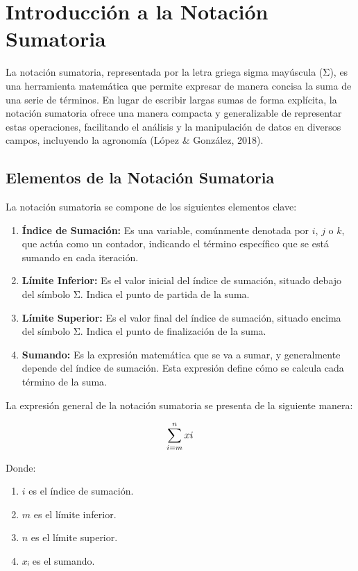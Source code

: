 \documentclass[
  spanish,
  letterpaper,
]{book}
\begin{document}
\chapter{Introducción a la Notación
Sumatoria}\label{introducciuxf3n-a-la-notaciuxf3n-sumatoria}

La notación sumatoria, representada por la letra griega sigma mayúscula
(Σ), es una herramienta matemática que permite expresar de manera
concisa la suma de una serie de términos. En lugar de escribir largas
sumas de forma explícita, la notación sumatoria ofrece una manera
compacta y generalizable de representar estas operaciones, facilitando
el análisis y la manipulación de datos en diversos campos, incluyendo la
agronomía (López \& González, 2018).

\section{Elementos de la Notación
Sumatoria}\label{elementos-de-la-notaciuxf3n-sumatoria}

La notación sumatoria se compone de los siguientes elementos clave:

\begin{enumerate}
\def\labelenumi{\arabic{enumi}.}
\item
  \textbf{Índice de Sumación:} Es una variable, comúnmente denotada por
  \(i\), \(j\) o \(k\), que actúa como un contador, indicando el término
  específico que se está sumando en cada iteración.
\item
  \textbf{Límite Inferior:} Es el valor inicial del índice de sumación,
  situado debajo del símbolo Σ. Indica el punto de partida de la suma.
\item
  \textbf{Límite Superior:} Es el valor final del índice de sumación,
  situado encima del símbolo Σ. Indica el punto de finalización de la
  suma.
\item
  \textbf{Sumando:} Es la expresión matemática que se va a sumar, y
  generalmente depende del índice de sumación. Esta expresión define
  cómo se calcula cada término de la suma.
\end{enumerate}

La expresión general de la notación sumatoria se presenta de la
siguiente manera:

\[\huge\sum_{i=m}^{n} xi\]

Donde:

\begin{enumerate}
\def\labelenumi{\arabic{enumi}.}
\item
  \(i\) es el índice de sumación.
\item
  \(m\) es el límite inferior.
\item
  \(n\) es el límite superior.
\item
  \(xᵢ\) es el sumando.
\end{enumerate}
\end{document}
